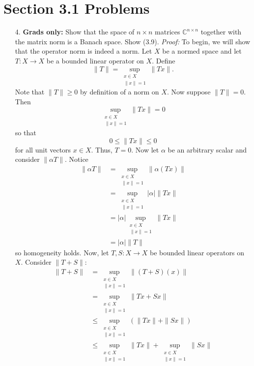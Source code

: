 \documentclass{article}
\begin{document}
\section*{Section 3.1 Problems}
\begin{itemize}
    \item[4.]\textbf{Grads only:} Show that the space of $n \times n$ matrices $\mathbb{C}^{n \times n}$ together with the matrix norm is a Banach space. Show (3.9).
    \newline\newline
    \textit{Proof:} To begin, we will show that the operator norm is indeed a norm. Let $X$ be a normed space and let $T : X \to X$ be a bounded linear operator on $X$. Define
    \[\|T\| = \sup_{\substack{x \in X \\ \|x\| = 1}} \|Tx\|.\]
    Note that $\|T\| \geq 0$ by definition of a norm on $X$. Now suppose $\|T\| = 0$. Then 
    \[\sup_{\substack{x \in X \\ \|x\| = 1}} \|Tx\| = 0\]
    so that
    \[0 \leq \|Tx\| \leq 0\]
    for all unit vectors $x \in X$. Thus, $T = 0$. Now let $\alpha$ be an arbitrary scalar and consider $\|\alpha T\|$. Notice
    \begin{align*}
        \|\alpha T\| &=\sup_{\substack{x \in X \\ \|x\| = 1}} \|\alpha (Tx)\| \tag*{(Def. scalar mult. of ops.)}\\
        &= \sup_{\substack{x \in X \\ \|x\| = 1}} |\alpha| \|Tx\| \tag*{(Homogeneity)}\\
        &= |\alpha| \sup_{\substack{x \in X \\ \|x\| = 1}} \|Tx\| \\
        &= |\alpha| \|T\|
    \end{align*}
    so homogeneity holds. Now, let $T,S : X \to X$ be bounded linear operators on $X$. Consider $\|T + S\|$:
    \begin{align*}
        \|T + S\| &= \sup_{\substack{x \in X \\ \|x\| = 1}} \|(T + S)(x)\| \tag*{(Def. add. of linear op.)}\\
        &= \sup_{\substack{x \in X \\ \|x\| = 1}} \|Tx + Sx\| \tag*{(Linearity)}\\
        &\leq \sup_{\substack{x \in X \\ \|x\| = 1}} (\|Tx\| + \|Sx\|)\\
        &\leq \sup_{\substack{x \in X \\ \|x\| = 1}} \|Tx\| + \sup_{\substack{x \in X \\ \|x\| = 1}}\|Sx\|\\

\end{align*}
\end{itemize}
\end{document}
